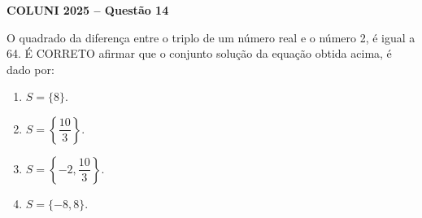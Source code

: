 \textbf{COLUNI 2025 -- Questão 14}\par\medskip O quadrado da diferença entre o triplo de um número real e o número 2, é igual a 64. É CORRETO afirmar que o conjunto solução da equação obtida acima, é dado por:
\begin{enumerate}
\item $S=\{8\}$.
\item $S=\left\{\dfrac{10}{3}\right\}$.
\item $S=\left\{-2,\dfrac{10}{3}\right\}$.
\item $S=\{-8,8\}$.
\end{enumerate}
